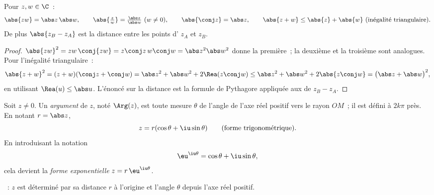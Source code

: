 \begin{proposition}\label{prop:g12:complex:modulus}
Pour $z, w \in \C$~:
\[
\abs{zw} = \abs z\,\abs w, \qquad
\abs{\tfrac zw} = \tfrac{\abs z}{\abs w}\ (w \neq 0), \qquad
\abs{\conj z} = \abs z, \qquad
\abs{z + w} \leq \abs{z} + \abs{w} \ \text{(inégalité triangulaire)}.
\]
De plus $\abs{z_B - z_A}$ est la distance entre les points d'
$z_A$ et $z_B$.
\end{proposition}

\begin{proof}
$\abs{zw}^2 = zw\,\conj{zw} = z\conj z\, w \conj w = \abs z^2 \abs w^2$
donne la première~; la deuxième et la troisième sont analogues. Pour
l'inégalité triangulaire~:
\[
\abs{z+w}^2 = (z+w)(\conj z + \conj w)
= \abs z^2 + \abs w^2 + 2\Rea(z \conj w)
\leq \abs z^2 + \abs w^2 + 2\abs{z\conj w}
= \bigl(\abs z + \abs w\bigr)^2,
\]
en utilisant $\Rea(u) \leq \abs u$. L'énoncé sur la distance est la formule
de Pythagore appliquée aux  de $z_B - z_A$.
\end{proof}

\begin{definition}\label{def:g12:complex:argument}
Soit $z \neq 0$. Un \emph{argument} de $z$, noté
$\Arg(z)$, est toute mesure $\theta$ de l'angle de l'axe réel positif vers
le rayon $OM$~; il est défini à $2k\pi$ près. En notant $r = \abs z$,
\[
z = r(\cos\theta + \iu\sin\theta)
\qquad\text{(forme trigonométrique)}.
\]
En introduisant la notation
\[
\eu^{\iu\theta} = \cos\theta + \iu\sin\theta,
\]
cela devient la \emph{forme exponentielle} $z = r\,\eu^{\iu\theta}$.
\end{definition}

\begin{omfigure}

{\small {}~: $z$ est déterminé par sa distance $r$ à
l'origine et l'angle $\theta$ depuis l'axe réel positif.}
\end{omfigure}

